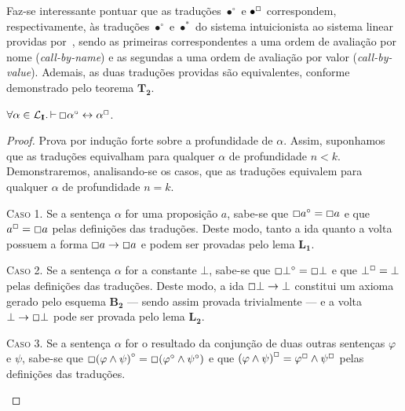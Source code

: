     Faz-se interessante pontuar que as traduções $\bullet^\circ$ e $\bullet^\Box$ correspondem, respectivamente, às traduções $\bullet^\circ$ e $\bullet^*$ do sistema intuicionista ao sistema linear providas por~\cite{Girard}, sendo as primeiras correspondentes a uma ordem de avaliação por nome (\textit{call-by-name}) e as segundas a uma ordem de avaliação por valor (\textit{call-by-value}). 
    Ademais, as duas traduções providas são equivalentes, conforme demonstrado pelo teorema $\mathbf{T_2}$.

    \begin{theorem}
        $\forall\alpha\in\mathcal{L}_\mathbf{I}\mathpunct{.}\mathop{\vdash}\Box\alpha^\circ\leftrightarrow\alpha^\Box$.

        \begin{proof}
            Prova por indução forte sobre a profundidade de $\alpha$.
            Assim, suponhamos que as traduções equivalham para qualquer $\alpha$ de profundidade $n<k$.
            Demonstraremos, analisando-se os casos, que as traduções equivalem para qualquer $\alpha$ de profundidade $n=k$.
    
            \begin{case}
                \textsc{Caso 1.}
                Se a sentença $\alpha$ for uma proposição $a$, sabe-se que $\Box a^\circ=\Box a$ e que $a^\Box =\Box a$ pelas definições das traduções.
                Deste modo, tanto a ida quanto a volta possuem a forma $\Box a\to\Box a$ e podem ser provadas pelo lema \hyperref[identity]{$\mathbf{L_1}$}.
            \end{case}

            \begin{case}
                \textsc{Caso 2.}
                Se a sentença $\alpha$ for a constante $\bot$, sabe-se que $\Box\bot^\circ=\Box\bot$ e que $\bot^\Box=\bot$ pelas definições das traduções.
                Deste modo, a ida $\Box\bot\to\bot$ constitui um axioma gerado pelo esquema $\mathbf{B_2}$ --- sendo assim provada trivialmente --- e a volta $\bot\to\Box\bot$ pode ser provada pelo lema \hyperref[explosion]{$\mathbf{L_2}$}.
            \end{case}
    
            \begin{case}
                \textsc{Caso 3.}
                Se a sentença $\alpha$ for o resultado da conjunção de duas outras sentenças $\varphi$ e $\psi$, sabe-se que $\Box{(\varphi\wedge\psi)}^\circ=\Box(\varphi^\circ\wedge\psi^\circ)$ e que ${(\varphi\wedge\psi)}^\Box=\varphi^\Box\wedge\psi^\Box$ pelas definições das traduções.
            \end{case}


\end{proof}
\end{theorem}
